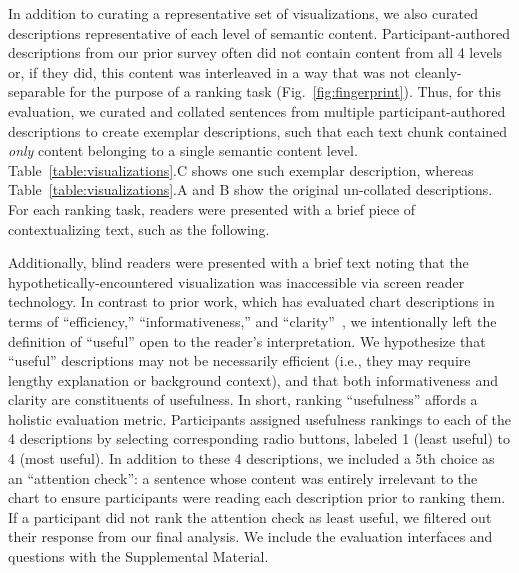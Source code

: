 In addition to curating a representative set of visualizations, we also curated descriptions representative of each level of semantic content.
Participant-authored descriptions from our prior survey often did not contain content from all 4 levels or, if they did, this content was interleaved in a way that was not cleanly-separable for the purpose of a ranking task (Fig.~\ref{fig:fingerprint}).
Thus, for this evaluation, we curated and collated sentences from multiple participant-authored descriptions to create exemplar descriptions, such that each text chunk contained \emph{only} content belonging to a single semantic content level.
Table~\ref{table:visualizations}.C shows one such exemplar description, whereas Table~\ref{table:visualizations}.A and B show the original un-collated descriptions.
For each ranking task, readers were presented with a brief piece of contextualizing text, such as the following.
\begin{displayquote}
    \vspace{-1mm}
    \vspace{-1mm}
\end{displayquote}
Additionally, blind readers were presented with a brief text noting that the hypothetically-encountered visualization was inaccessible via screen reader technology.
In contrast to prior work, which has evaluated chart descriptions in terms of ``efficiency,'' ``informativeness,'' and ``clarity''~\cite{gould_effective_2008, obeid_chart--text_2020}, we intentionally left the definition of ``useful'' open to the reader’s interpretation. 
We hypothesize that ``useful'' descriptions may not be necessarily efficient (i.e., they may require lengthy explanation or background context), and that both informativeness and clarity are constituents of usefulness.
In short, ranking ``usefulness'' affords a holistic evaluation metric.
Participants assigned usefulness rankings to each of the 4 descriptions by selecting corresponding radio buttons, {labeled 1 (least useful) to 4 (most useful)}.
In addition to these 4 descriptions, we included a 5th choice as an ``attention check'': a sentence whose content was entirely irrelevant to the chart to ensure participants were reading each description prior to ranking them.
If a participant did not rank the attention check as least useful, we filtered out their response from our final analysis.
{We include the evaluation interfaces and questions with the Supplemental Material.}

